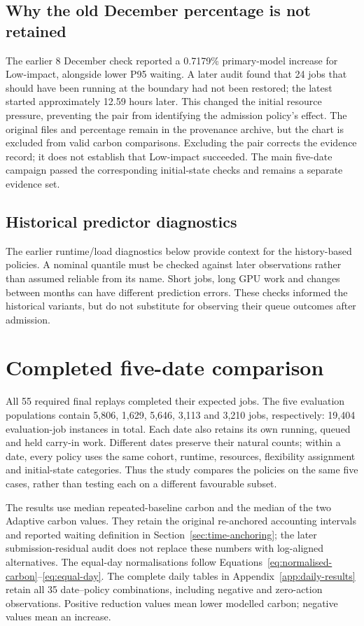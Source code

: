 \subsection{Why the old December percentage is not retained}
The earlier 8 December check reported a 0.7179\% primary-model increase for Low-impact, alongside lower P95 waiting. A later audit found that 24 jobs that should have been running at the boundary had not been restored; the latest started approximately 12.59 hours later. This changed the initial resource pressure, preventing the pair from identifying the admission policy's effect. The original files and percentage remain in the provenance archive, but the chart is excluded from valid carbon comparisons. Excluding the pair corrects the evidence record; it does not establish that Low-impact succeeded. The main five-date campaign passed the corresponding initial-state checks and remains a separate evidence set.

\subsection{Historical predictor diagnostics}
The earlier runtime/load diagnostics below provide context for the history-based policies. A nominal quantile must be checked against later observations rather than assumed reliable from its name. Short jobs, long GPU work and changes between months can have different prediction errors. These checks informed the historical variants, but do not substitute for observing their queue outcomes after admission.

\FloatBarrier

\section{Completed five-date comparison}\label{sec:main-results}
All 55 required final replays completed their expected jobs. The five evaluation populations contain 5,806, 1,629, 5,646, 3,113 and 3,210 jobs, respectively: 19,404 evaluation-job instances in total. Each date also retains its own running, queued and held carry-in work. Different dates preserve their natural counts; within a date, every policy uses the same cohort, runtime, resources, flexibility assignment and initial-state categories. Thus the study compares the policies on the same five cases, rather than testing each on a different favourable subset.

The results use median repeated-baseline carbon and the median of the two Adaptive carbon values. They retain the original re-anchored accounting intervals and reported waiting definition in Section~\ref{sec:time-anchoring}; the later submission-residual audit does not replace these numbers with log-aligned alternatives. The equal-day normalisations follow Equations~\ref{eq:normalised-carbon}--\ref{eq:equal-day}. The complete daily tables in Appendix~\ref{app:daily-results} retain all 35 date--policy combinations, including negative and zero-action observations. Positive reduction values mean lower modelled carbon; negative values mean an increase.


\FloatBarrier

